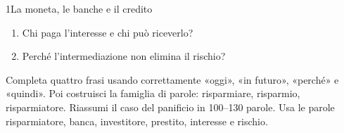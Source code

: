 \begin{lettura}{1}{La moneta, le banche e il credito}
\begin{enumerate}
\item Chi paga l’interesse e chi può riceverlo?

\item Perché l’intermediazione non elimina il rischio?

\end{enumerate}
\lessico








\lingua
Completa quattro frasi usando correttamente «oggi», «in futuro», «perché» e «quindi». Poi costruisci la famiglia di parole: risparmiare, risparmio, risparmiatore.
\scrittura
Riassumi il caso del panificio in 100--130 parole. Usa le parole risparmiatore, banca, investitore, prestito, interesse e rischio.

\end{lettura}


